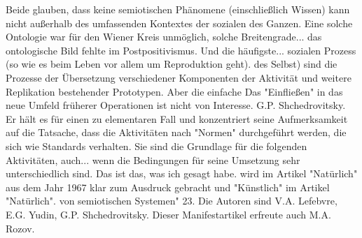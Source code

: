 \documentclass[11pt,a4paper]{article}
\begin{document}
Beide glauben, dass keine semiotischen Phänomene (einschließlich Wissen)
kann nicht außerhalb des umfassenden Kontextes der sozialen
des Ganzen. Eine solche Ontologie war für den Wiener Kreis unmöglich, solche Breitengrade...
das ontologische Bild fehlte im Postpositivismus. Und die häufigste...
sozialen Prozess (so wie es beim Leben vor allem um Reproduktion geht).
des Selbst) sind die Prozesse der Übersetzung verschiedener Komponenten der Aktivität und
weitere Replikation bestehender Prototypen. Aber die einfache
Das "Einfließen" in das neue Umfeld früherer Operationen ist nicht von Interesse.
G.P. Shchedrovitsky. Er hält es für einen zu elementaren Fall und konzentriert
seine Aufmerksamkeit auf die Tatsache, dass die Aktivitäten nach "Normen" durchgeführt werden, die
sich wie Standards verhalten. Sie sind die Grundlage für die folgenden Aktivitäten, auch...
wenn die Bedingungen für seine Umsetzung sehr unterschiedlich sind. Das ist das, was ich gesagt habe.
wird im Artikel "Natürlich" aus dem Jahr 1967 klar zum Ausdruck gebracht und "Künstlich" im Artikel "Natürlich".
von semiotischen Systemen" 23. Die Autoren sind V.A. Lefebvre, E.G. Yudin,
G.P. Shchedrovitsky. Dieser Manifestartikel erfreute auch M.A. Rozov.
\end{document}

